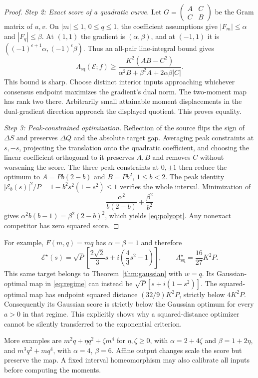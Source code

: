 \documentclass[11pt,letterpaper]{article}
\theoremstyle{remark}
\newcommand{\enc}{\mathscr E}
\newcommand{\sq}{\mathrm{sq}}
\newcommand{\C}{\mathbb C}
\begin{document}
\begin{proof}
\emph{Step 2: Exact score of a quadratic curve.}
Let $G=\left(\begin{smallmatrix}A&C\\C&B\end{smallmatrix}\right)$ be the Gram matrix of $u,v$. On $|m|\le1$, $0\le q\le1$, the coefficient assumptions give $|F_m|\le\alpha$ and $|F_q|\le\beta$. At $(1,1)$ the gradient is $(\alpha,\beta)$, and at $(-1,1)$ it is $((-1)^{\epsilon+1}\alpha,(-1)^\epsilon\beta)$. Thus an all-pair line-integral bound gives
$$
 \Lambda_{\sq}(\enc;f)
 \ge\frac{K^2(AB-C^2)}{\alpha^2B+\beta^2A+2\alpha\beta|C|}.
$$
This bound is sharp. Choose distinct interior inputs approaching whichever consensus endpoint maximizes the gradient's dual norm. The two-moment map has rank two there. Arbitrarily small attainable moment displacements in the dual-gradient direction approach the displayed quotient. This proves equality.

\emph{Step 3: Peak-constrained optimization.}
Reflection of the source flips the sign of $\Delta S$ and preserves $\Delta Q$ and the absolute target gap. Averaging peak constraints at $s,-s$, projecting the translation onto the quadratic coefficient, and choosing the linear coefficient orthogonal to it preserves $A,B$ and removes $C$ without worsening the score. The three peak constraints at $0,\pm1$ then reduce the optimum to $A=P b(2-b)$ and $B=P b^2$, $1\le b<2$. The peak identity $|\enc_b(s)|^2/P=1-b^2s^2(1-s^2)\le1$ verifies the whole interval. Minimization of
$$
 \frac{\alpha^2}{b(2-b)}+\frac{\beta^2}{b^2}
$$
gives $\alpha^2b(b-1)=\beta^2(2-b)^2$, which yields \eqref{eq:polyopt}. Any nonexact competitor has zero squared score.
\end{proof}

For example, $F(m,q)=m q$ has $\alpha=\beta=1$ and therefore
$$
 \enc^\star(s)=\sqrt P\left[\frac{2\sqrt2}{3}s
 +i\left(\frac43s^2-1\right)\right],\qquad
 \Lambda_{\sq}^\star=\frac{16}{27}K^2P.
$$
This same target belongs to Theorem~\ref{thm:gaussian} with $w=q$. Its Gaussian-optimal map in \eqref{eq:regime} can instead be $\sqrt P[s+i(1-s^2)]$. The squared-optimal map has endpoint squared distance $(32/9)K^2P$, strictly below $4K^2P$. Consequently its Gaussian score is strictly below the Gaussian optimum for every $a>0$ in that regime. This explicitly shows why a squared-distance optimizer cannot be silently transferred to the exponential criterion.

More examples are $m^2q+\eta q^2+\zeta m^4$ for $\eta,\zeta\ge0$, with $\alpha=2+4\zeta$ and $\beta=1+2\eta$, and $m^3q^2+m q^4$, with $\alpha=4$, $\beta=6$. Affine output changes scale the score but preserve the map. A fixed interval homeomorphism may also calibrate all inputs before computing the moments.
\end{document}
